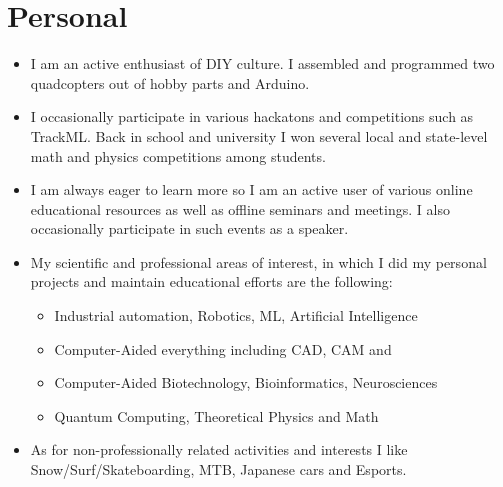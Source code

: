 \documentclass[a4paper,10pt]{article}
\begin{document}
\begin{adjustbox}{valign=t}
\begin{minipage}{0.61\textwidth}
\section*{Personal}
\begin{itemize}[noitemsep]
	\item I am an active enthusiast of DIY culture. I assembled and programmed two quadcopters out of hobby parts 
		and Arduino.
	\item I occasionally participate in various hackatons and competitions such as TrackML. Back in school and 
		university I won several local and state-level math and physics competitions among students.
	\item I am always eager to learn more so I am an active user of various online educational resources as well 
		as offline seminars and meetings. I also occasionally participate in such events as a speaker.
	\item My scientific and professional areas of interest, in which I did my personal projects and 
		maintain educational efforts are the following:
	\begin{itemize}[noitemsep]
        \item Industrial automation, Robotics, ML, Artificial Intelligence
        \item Computer-Aided everything including CAD, CAM and 
		\item Computer-Aided Biotechnology, Bioinformatics, Neurosciences
		\item Quantum Computing, Theoretical Physics and Math
	\end{itemize}
	\item As for non-professionally related activities and interests 
	I like Snow/Surf/Skateboarding, MTB, Japanese cars and Esports.
\end{itemize}

\end{minipage}
\end{adjustbox}
\end{document}
